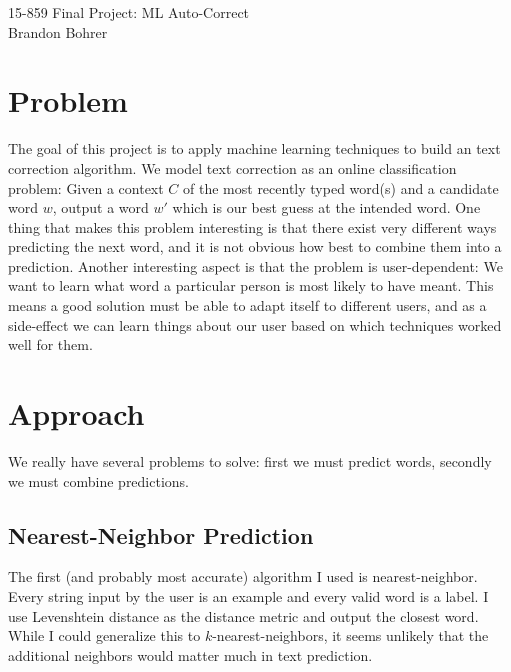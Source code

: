 \documentclass[12pt]{article}
\begin{document}
\begin{center}
  15-859 Final Project: ML Auto-Correct\\ Brandon Bohrer
\end{center}
\section{Problem}
The goal of this project is to apply machine learning techniques to
build an text correction algorithm. We model text correction as an
online classification problem: Given a context $C$ of the most
recently typed word(s) and a candidate word $w$, output a word $w'$
which is our best guess at the intended word. One thing that makes
this problem interesting is that there exist very different ways
predicting the next word, and it is not obvious how best to combine
them into a prediction.  Another interesting aspect is that the
problem is user-dependent: We want to learn what word a particular
person is most likely to have meant.  This means a good solution must
be able to adapt itself to different users, and as a side-effect we
can learn things about our user based on which techniques worked well
for them.

\section{Approach}
We really have several problems to solve: first we must predict words,
secondly we must combine predictions.

\subsection{Nearest-Neighbor Prediction}
The first (and probably most accurate) algorithm I used is
nearest-neighbor. Every string input by the user is an example and
every valid word is a label. I use Levenshtein distance as the
distance metric and output the closest word. While I could generalize
this to $k$-nearest-neighbors, it seems unlikely that the additional
neighbors would matter much in text prediction.
\end{document}
